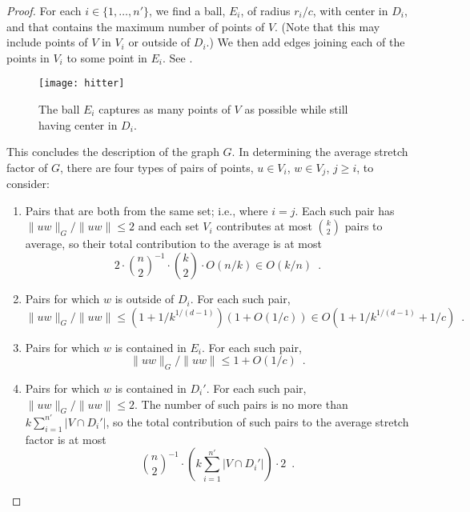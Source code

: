 \documentclass{patmorin}
\begin{document}
\begin{proof}
  For each $i\in\{1,\ldots,n'\}$, we find a ball, $E_i$, of radius
  $r_i/c$, with center in $D_i$, and that contains the maximum number
  of points of $V$.  (Note that this may include points of $V$ in $V_i$
  or outside of $D_i$.)  We then add edges joining each of the points
  in $V_i$ to some point in $E_i$.  See .

  \begin{figure}
    \begin{center}
      \texttt{[image: hitter]}
    \end{center}
    \caption{The ball $E_i$ captures as many points of $V$ as possible
     while still having center in $D_i$.}
  \end{figure}

  This concludes the description of the graph $G$.  In determining the
  average stretch factor of $G$, there are four types of pairs of points,
  $u\in V_i$, $w\in V_j$, $j\ge i$, to consider:
  \begin{enumerate}
    \item Pairs that are both from the same set; i.e., where $i=j$.  Each such
      pair has $\|uw\|_G/\|uw\|\le 2$ and each set $V_i$ contributes at
      most $\binom{k}{2}$ pairs to average, so their total contribution
      to the average is at most
      \[
        2\cdot\binom{n}{2}^{-1}\cdot\binom{k}{2}\cdot O(n/k) \in O(k/n)
        \enspace .
      \]
    \item Pairs for which $w$ is outside of $D_i$.  For each
      such pair, 
      \[
        \|uw\|_G/\|uw\|\le (1+1/k^{1/(d-1)})(1+O(1/c)) \in O(1+1/k^{1/(d-1)}+1/c) \enspace .
      \]
    \item Pairs for which $w$ is contained in $E_i$.  For each
      such pair, 
      \[
        \|uw\|_G/\|uw\|\le 1+O(1/c) \enspace .
      \]
    \item Pairs for which $w$ is contained in $D_i'$.  For each
      such pair, $\|uw\|_G/\|uw\|\le 2$.  The number of such pairs is no
      more than $k\sum_{i=1}^{n'}|V\cap D_i'|$, so the total contribution
      of such pairs to the average stretch factor is at most
      \[
            \binom{n}{2}^{-1}\cdot\left(k\sum_{i=1}^{n'} |V\cap D_i'|\right)\cdot 2 \enspace .
      \]
  \end{enumerate}


\end{proof}
\end{document}
